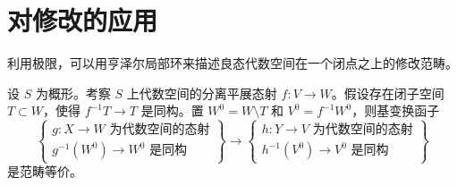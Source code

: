 \section{对修改的应用}
\label{section-modifications-at-a-point}

\noindent
利用极限，可以用亨泽尔局部环来描述良态代数空间在一个闭点之上的修改范畴。

\begin{lemma}
\label{lemma-excision-modifications}
设 $S$ 为概形。考察 $S$ 上代数空间的分离平展态射
$f : V \to W$。假设存在闭子空间 $T \subset W$，使得
$f^{-1}T \to T$ 是同构。置 $W^0 = W \setminus T$ 和
$V^0 = f^{-1}W^0$，则基变换函子
$$
\left\{
\begin{matrix}
g : X \to W\text{ 为代数空间的态射} \\
g^{-1}(W^0) \to W^0\text{ 是同构}
\end{matrix}
\right\}
\longrightarrow
\left\{
\begin{matrix}
h : Y \to V\text{ 为代数空间的态射} \\
h^{-1}(V^0) \to V^0\text{ 是同构}
\end{matrix}
\right\}
$$
是范畴等价。
\end{lemma}

